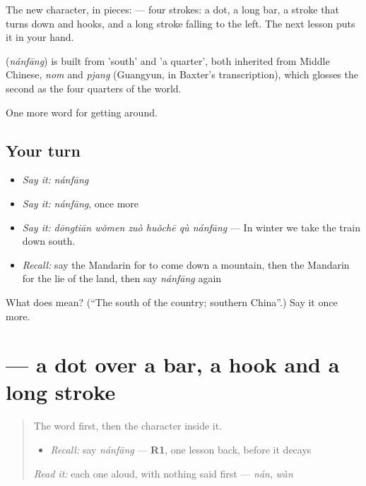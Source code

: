 The new character, in pieces:  — four strokes: a dot, a long bar, a stroke that turns down and hooks, and a long stroke falling to the left. The next lesson puts it in your hand.

\begin{cousinweb}
\textbf{} (\emph{nánfāng}) is built from  'south' and  'a quarter', both inherited from Middle Chinese, \emph{nom} and \emph{pjang} (Guangyun, in Baxter's transcription), which glosses the second as the four quarters of the world.
\end{cousinweb}

\begin{grammarlens}[title={What you've built}]
One more word for getting around.
\end{grammarlens}

\subsection*{Your turn}
\begin{itemize}
\raggedright
  \item \emph{Say it:} \emph{nánfāng}
  \item \emph{Say it:} \emph{nánfāng}, once more
  \item \emph{Say it:} \emph{dōngtiān wǒmen zuò huǒchē qù nánfāng} — In winter we take the train down south.
  \item \emph{Recall:} say the Mandarin for to come down a mountain, then the Mandarin for the lie of the land, then say \emph{nánfāng} again
\end{itemize}

\begin{tcolorbox}[breakable,colback=teal!4,colframe=teal!35!black,title={Before you move on}]
What does  mean? (\textquotedblleft{}The south of the country; southern China\textquotedblright{}.) Say it once more.
\end{tcolorbox}
\section[\texorpdfstring{\zh{方} (fāng)}{方 (fāng)}]{ — a dot over a bar, a hook and a long stroke}

\label{lesson:ZH-W436-fang-side}



\begin{quote}
The word first, then the character inside it.

\begin{itemize}
\raggedright
  \item \emph{Recall:} say \emph{nánfāng} — \textbf{R1}, one lesson back, before it decays
\end{itemize}

\begin{quote}
 
\end{quote}

\emph{Read it:} each one aloud, with nothing said first — \emph{nán}, \emph{wàn}
\end{quote}

